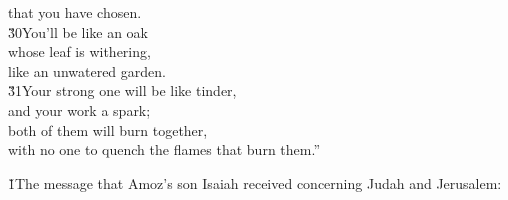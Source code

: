 \begin{poetry}
\poemll    that you have chosen. \\
\poeml \v{30}You'll be like an oak \\
\poemll    whose leaf is withering, \\
\poemlll       like an unwatered garden. \\
\poeml \v{31}Your strong one will be like tinder, \\
\poemll    and your work a spark; \\
\poeml both of them will burn together, \\
\poemll    with no one to quench the flames that burn them.''
\end{poetry}

\v{1}The message that Amoz's son Isaiah received concerning Judah and Jerusalem:

